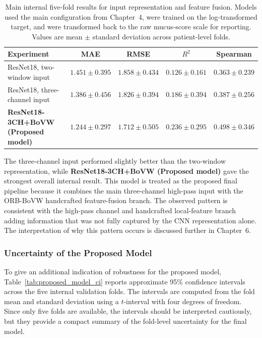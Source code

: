 \begin{table}[H]
\centering
\caption{Main internal five-fold results for input representation and feature fusion. Models used the main configuration from Chapter~4, were trained on the log-transformed target, and were transformed back to the raw mucus-score scale for reporting. Values are mean \(\pm\) standard deviation across patient-level folds.}
\label{tab:internal_representation_fusion_results}
\small
\setlength{\tabcolsep}{4pt}
\begin{tabularx}{\textwidth}{@{}>{\raggedright\arraybackslash}Xcccc@{}}
\toprule
Experiment & MAE & RMSE & \(R^2\) & Spearman \\
\midrule
ResNet18, two-window input & \(1.451 \pm 0.395\) & \(1.858 \pm 0.434\) & \(0.126 \pm 0.161\) & \(0.363 \pm 0.239\) \\
ResNet18, three-channel input & \(1.386 \pm 0.456\) & \(1.826 \pm 0.394\) & \(0.186 \pm 0.394\) & \(0.387 \pm 0.256\) \\
\textbf{ResNet18-3CH+BoVW (Proposed model)} & \(\mathbf{1.244 \pm 0.297}\) & \(\mathbf{1.712 \pm 0.505}\) & \(\mathbf{0.236 \pm 0.295}\) & \(\mathbf{0.498 \pm 0.346}\) \\
\bottomrule
\end{tabularx}
\end{table}


The three-channel input performed slightly better than the two-window representation, while \textbf{ResNet18-3CH+BoVW (Proposed model)} gave the strongest overall internal result. This model is treated as the proposed final pipeline because it combines the main three-channel high-pass input with the ORB-BoVW handcrafted feature-fusion branch. The observed pattern is consistent with the high-pass channel and handcrafted local-feature branch adding information that was not fully captured by the CNN representation alone. The interpretation of why this pattern occurs is discussed further in Chapter~6.


\subsubsection{Uncertainty of the Proposed Model}
\label{sec:proposed_model_uncertainty}

To give an additional indication of robustness for the proposed model, Table~\ref{tab:proposed_model_ci} reports approximate 95\% confidence intervals across the five internal validation folds. The intervals are computed from the fold mean and standard deviation using a \(t\)-interval with four degrees of freedom. Since only five folds are available, the intervals should be interpreted cautiously, but they provide a compact summary of the fold-level uncertainty for the final model.

